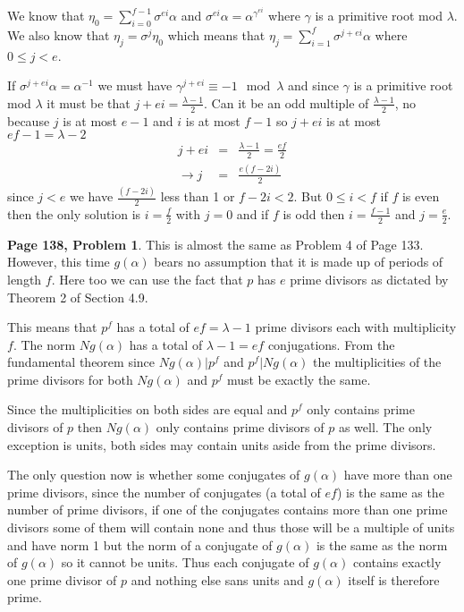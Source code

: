 \documentclass[aps,preprint,preprintnumbers,nofootinbib,showpacs,prd]{revtex4-1}
\newcommand{\nbea}{\begin{eqnarray*}}
\newcommand{\neea}{\end{eqnarray*}}
\begin{document}
We know that $\eta_0 = \sum_{i=0}^{f-1}\sigma^{ei} \alpha$ and $\sigma^{ei}\alpha = \alpha^{\gamma^{ei}}$ where $\gamma$ is a primitive root mod $\lambda$. We also know that $\eta_j = \sigma^j \eta_0$ which means that $\eta_j = \sum_{i=1}^{f}\sigma^{j+ei} \alpha$ where $0 \le j < e$.

If $\sigma^{j+ei} \alpha = \alpha^{-1}$ we must have $\gamma^{j+ei} \equiv -1 \mod \lambda$ and since $\gamma$ is a primitive root mod $\lambda$ it must be that $j + ei = \frac{\lambda - 1}{2}$. Can it be an odd multiple of $\frac{\lambda - 1}{2}$, no because $j$ is at most $e - 1$ and $i$ is at most $f - 1$ so $j + ei$ is at most $ef - 1 = \lambda - 2$
%
\nbea
j + ei & = & \frac{\lambda - 1}{2} = \frac{ef}{2} \\
\to j & = & \frac{e(f - 2i)}{2}
\neea
%
since $j < e$ we have $\frac{(f - 2i)}{2}$ less than 1 or $f - 2i < 2$. But $0 \le i < f$ if $f$ is even then the only solution is $i = \frac{f}{2}$ with $j = 0$ and if $f$ is odd then $i = \frac{f - 1}{2}$ and $j = \frac{e}{2}$.




{\bf Page 138, Problem 1}. This is almost the same as Problem 4 of Page 133. However, this time $g(\alpha)$ bears no assumption that it is made up of periods of length $f$. Here too we can use the fact that $p$ has $e$ prime divisors as dictated by Theorem 2 of Section 4.9.

This means that $p^f$ has a total of $ef = \lambda - 1$ prime divisors each with multiplicity $f$. The norm $Ng(\alpha)$ has a total of $\lambda - 1 = ef$ conjugations. From the fundamental theorem since $Ng(\alpha)|p^f$ and $p^f|Ng(\alpha)$ the multiplicities of the prime divisors for both $Ng(\alpha)$ and $p^f$ must be exactly the same.

Since the multiplicities on both sides are equal and $p^f$ only contains prime divisors of $p$ then $Ng(\alpha)$ only contains prime divisors of $p$ as well. The only exception is units, both sides may contain units aside from the prime divisors.

The only question now is whether some conjugates of $g(\alpha)$ have more than one prime divisors, since the number of conjugates (a total of $ef$) is the same as the number of prime divisors, if one of the conjugates contains more than one prime divisors some of them will contain none and thus those will be a multiple of units and have norm 1 but the norm of a conjugate of $g(\alpha)$ is the same as the norm of $g(\alpha)$ so it cannot be units. Thus each conjugate of $g(\alpha)$ contains exactly one prime divisor of $p$ and nothing else sans units and $g(\alpha)$ itself is therefore prime.
\end{document}
